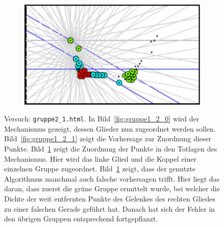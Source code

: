 \begin{figure}
\begin{subfigure}[t]{0.24\textwidth}
        \caption{}
        \label{fig:gruppe1_2_2}
    \end{subfigure}
    \begin{subfigure}[t]{0.24\textwidth}
        \includegraphics[width=\textwidth]{gfx/gruppe1_2_3.png}
        \caption{}
        \label{fig:gruppe1_2_3}
    \end{subfigure}
    \caption{Versuch: \lstinline{gruppe2_1.html}. In Bild~\ref{fig:gruppe1_2_0} wird der Mechanismus gezeigt, dessen Glieder nun zugeordnet werden sollen.
    Bild~\ref{fig:gruppe1_2_1} zeigt die Vorhersage zur Zuordnung dieser Punkte.
    Bild~\ref{fig:gruppe1_2_2} zeigt die Zuordnung der Punkte in den Totlagen des Mechanismus. Hier wird das linke Glied und die Koppel einer einzelnen Gruppe zugeordnet. Bild~\ref{fig:gruppe1_2_2} zeigt, dass der genutzte Algorithmus manchmal auch falsche vorhersagen trifft. Hier liegt das daran, dass zuerst die grüne Gruppe ermittelt wurde, bei welcher die Dichte der weit entfernten Punkte des Gelenkes des rechten Gliedes zu einer falschen Gerade geführt hat. Danach hat sich der Fehler in den übrigen Gruppen entsprechend fortgepflanzt.}
    \label{fig:gruppe1_2}
\end{figure}

